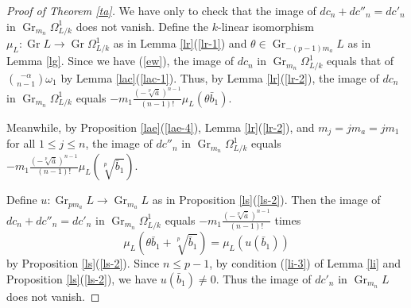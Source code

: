 \documentclass[sn-mathphys-num]{sn-jnl}
\numberwithin{equation}{section}
\newcommand{\Gr}{\operatorname{Gr}}
\theoremstyle{plain}
\theoremstyle{definition}
\begin{document}
\begin{proof}[Proof of Theorem \ref{ta}]
We have only to check that the image of $dc_n+dc''_n=dc'_n$ in $\Gr_{m_n}\Omega_{L/k}^1$ does not vanish. Define the $k$-linear isomorphism $\mu_{L}:\Gr L\to\Gr \Omega_{L/k}^1$ as in Lemma \ref{lr}(\ref{lr-1}) and $\theta\in \Gr_{-(p-1)m_a}L$ as in Lemma \ref{lg}. Since we have (\ref{ew}), the image of $dc_n$ in $\Gr_{m_n}\Omega_{L/k}^1$ equals that of $\displaystyle{\binom{-\alpha}{n-1}\omega_1}$ by Lemma \ref{lac}(\ref{lac-1}). Thus, by Lemma \ref{lr}(\ref{lr-2}), the image of $dc_n$ in $\Gr_{m_n}\Omega_{L/k}^1$ equals $\displaystyle{-m_1\frac{(-\sqrt[p]{\bar{a}})^{n-1}}{(n-1)!}\mu_{L}(\theta\bar{b}_1)}$.

Meanwhile, by Proposition \ref{lae}(\ref{lae-4}), Lemma \ref{lr}(\ref{lr-2}), and $m_j=jm_a=jm_1$ for all $1\leq j\leq n$, the image of $dc''_n$ in $\Gr_{m_n}\Omega_{L/k}^1$ equals $\displaystyle{-m_1\frac{(-\sqrt[p]{\bar{a}})^{n-1}}{(n-1)!}\mu_{L}\left(\sqrt[p]{\bar{b}_1}\right)}$.

Define $u:\Gr_{pm_a}L\to\Gr_{m_a}L$ as in Proposition \ref{ls}(\ref{ls-2}). Then the image of $dc_n+dc''_n=dc'_n$ in $\Gr_{m_n}\Omega_{L/k}^1$ equals $\displaystyle{-m_1\frac{(-\sqrt[p]{\bar{a}})^{n-1}}{(n-1)!}}$ times
\begin{equation}
\mu_{L}\left(\theta\bar{b}_1+\sqrt[p]{\bar{b}_1}\right)=\mu_{L}(u(\bar{b}_1))
\end{equation}
by Proposition \ref{ls}(\ref{ls-2}). Since $n\leq p-1$, by condition (\ref{li-3}) of Lemma \ref{li} and Proposition \ref{ls}(\ref{ls-2}), we have $u(\bar{b}_1)\neq 0$. Thus the image of $dc'_n$ in $\Gr_{m_n}L$ does not vanish. 
\end{proof}
\end{document}
